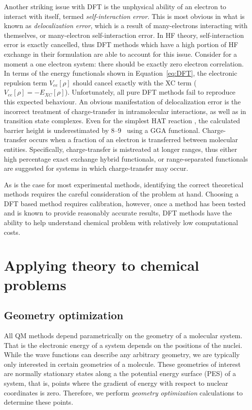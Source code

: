 Another striking issue with DFT is the unphysical ability of an electron to
interact with itself, termed \emph{self-interaction error}. This is most
obvious in what is known as \emph{delocalization error}, which is a result of
many-electrons interacting with themselves, or many-electron self-interaction
error. In HF theory, self-interaction error is exactly cancelled, thus DFT
methods which have a high portion of HF exchange in their formulation are able
to account for this issue. Consider for a moment a one electron system: there
should be exactly zero electron correlation. In terms of the energy functionals
shown in Equation~\ref{eq:DFT}, the electronic repulsion term $V_{ee}[\rho]$
should cancel exactly with the XC term ($V_{ee}[\rho] =
-E_{XC}[\rho]$).\cite{Cramer2004} Unfortunately, all pure DFT methods fail to
reproduce this expected behaviour. An obvious manifestation of delocalization
error is the incorrect treatment of charge-transfer in intramolecular
interactions,\cite{MoriSanchez2008,OterodelaRoza2014} as well as in transition
state complexes. Even for the simplest HAT reaction ,
the calculated barrier height is underestimated by 8--9 \kcalmol\ using a GGA
functional.\cite{Csonka1998} Charge-transfer occurs when a fraction of an
electron is transferred between molecular entities. Specifically,
charge-transfer is mistreated at longer ranges, thus either high percentage
exact exchange hybrid functionals, or range-separated functionals are suggested
for systems in which charge-transfer may occur.

As is the case for most experimental methods, identifying the correct
theoretical methods requires the careful consideration of the problem at hand.
Choosing a DFT based method requires calibration, however, once a method has
been tested and is known to provide reasonably accurate results, DFT methods
have the ability to help understand chemical problem with relatively low
computational costs.

\section{Applying theory to chemical problems}

\subsection{Geometry optimization}

All QM methods depend parametrically on the geometry of a molecular system.
That is the electronic energy of a system depends on the positions of the
nuclei. While the wave functions can describe any arbitrary geometry, we are
typically only interested in certain geometries of a molecule. These geometries
of interest are normally stationary states along a the potential energy surface
(PES) of a system, that is, points where the gradient of energy with respect to
nuclear coordinates is zero. Therefore, we perform \emph{geometry optimization}
calculations to determine these points.

